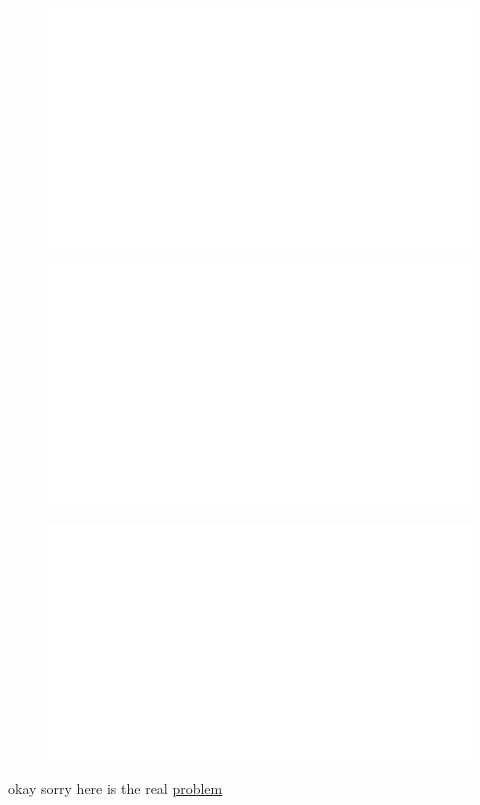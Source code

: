 \begin{centering}
    \begin{figure}[h!]
        \centering
        \includegraphics[width=\textwidth]{whyareyoucheckingthenameofthisfile.png}
    \end{figure}
\end{centering}

\begin{centering}
    \begin{figure}[h]
        \centering
        \includegraphics[width=\textwidth]{whyareyoucheckingthenameofthisfile.png}
    \end{figure}
\end{centering}

\begin{centering}
    \begin{figure}
        \centering
        \includegraphics[width=\textwidth]{whyareyoucheckingthenameofthisfile.png}
    \end{figure}
\end{centering}
\noindent


okay sorry here is the real \href{https://www.youtube.com/watch?v=dQw4w9WgXcQ}{problem}
